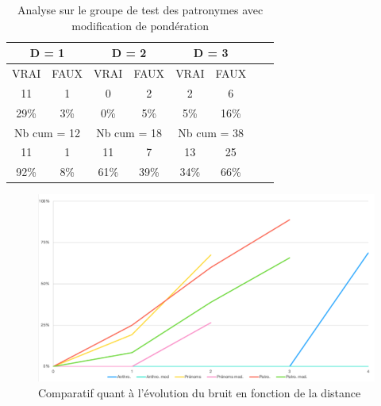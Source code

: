 \renewcommand{\arraystretch} {1.25}
\begin{table}[ht]
    \centering
    \begin{tabular}{|c|c|c|c|c|c|c|c|}
        \hline \multicolumn{2}{|c}{D = 1}& \multicolumn{2}{|c}{D = 2} & \multicolumn{2}{|c|}{D = 3} \\
        \hline VRAI & FAUX & VRAI & FAUX & VRAI & FAUX \\
        \hline \hline  11 & 1 & 0 & 2 & 2 & 6 \\
        \hline 29\% & 3\% & 0\% & 5\% & 5\% & 16\% \\
        \hline \hline \multicolumn{2}{|c}{Nb cum = 12}& \multicolumn{2}{|c|}{Nb cum = 18} & \multicolumn{2}{c|}{Nb cum = 38} \\
        \hline \hline  11 & 1 & 11 & 7 & 13 & 25 \\
        \hline 92\% & 8\% & 61\% & 39\% & 34\% & 66\% \\
        \hline 
    \end{tabular}
    \caption{Analyse sur le groupe de test des patronymes avec modification de pondération}
    \label{groupe_patro_md}
\end{table}

\begin{figure}[ht] %
    \centering
    \includegraphics[scale=0.5]{3.Results/Img/noise_rate.png}
    \caption{Comparatif quant à l'évolution du bruit en fonction de la distance}
    \label{graph_methode_cluster}
\end{figure}

